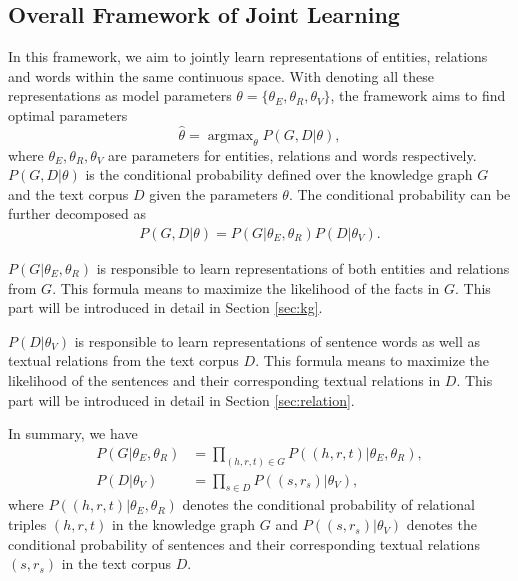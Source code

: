 \documentclass[11pt,a4paper]{article}
\begin{document}


\subsection{Overall Framework of Joint Learning}
\label{sec:joint}

In this framework, we aim to jointly learn representations of entities, relations and words within the same continuous space. With denoting all these representations as model parameters $\theta = \{\theta_E, \theta_R, \theta_V\}$, the framework aims to find optimal parameters
\begin{equation}
\hat{\theta} = \mathop{\arg\max}_{\theta} P(G, D | {\theta}),
\end{equation}
where $\theta_E, \theta_R, \theta_V$ are parameters for entities, relations and words respectively. $P(G, D | {\theta})$ is the conditional probability defined over the knowledge graph $G$ and the text corpus $D$ given the parameters $\theta$. The conditional probability can be further decomposed as
\begin{align}
\label{eq:topeq}
P(G,D|{\theta}) = P(G|{\theta_E,\theta_R})P(D|{\theta_V}).
\end{align}

$P(G|\theta_E, \theta_R)$ is responsible to learn representations of both entities and relations from $G$. This formula means to maximize the likelihood of the facts in $G$. This part will be introduced in detail in Section \ref{sec:kg}. 

$P(D|{\theta_V})$ is responsible to learn representations of sentence words as well as textual relations from the text corpus $D$. This formula means to maximize the likelihood of the sentences and their corresponding textual relations in $D$. This part will be introduced in detail in Section \ref{sec:relation}. 

In summary, we have
\begin{align}
 P(G|{\theta_E,\theta_R}) & = \prod_{(h,r,t) \in G}P((h, r, t)|{\theta_E, \theta_R}), \\
 P(D|{\theta_V}) & = \prod_{s \in D}P((s, r_s)|{\theta_V}),
\end{align}
where $P((h, r, t)|{\theta_E,\theta_R})$ denotes the conditional probability of relational triples $(h, r, t)$ in the knowledge graph $G$ and $P((s, r_s)|{\theta_V})$ denotes the conditional probability of sentences and their corresponding textual relations $(s, r_s)$ in the text corpus $D$.
\end{document}
